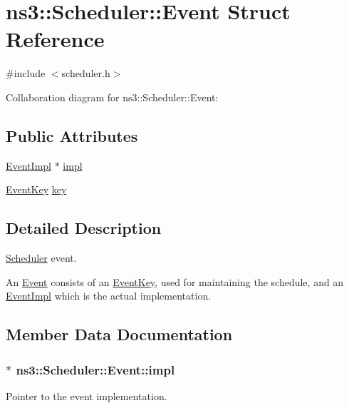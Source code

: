 \hypertarget{structns3_1_1Scheduler_1_1Event}{}\section{ns3\+:\+:Scheduler\+:\+:Event Struct Reference}
\label{structns3_1_1Scheduler_1_1Event}


{\ttfamily \#include $<$scheduler.\+h$>$}



Collaboration diagram for ns3\+:\+:Scheduler\+:\+:Event\+:
\subsection*{Public Attributes}
\begin{DoxyCompactItemize}
\item 
\hyperlink{classns3_1_1EventImpl}{Event\+Impl} $\ast$ \hyperlink{structns3_1_1Scheduler_1_1Event_ae12a8784ab1619e5c759b62102676a9b}{impl}
\item 
\hyperlink{structns3_1_1Scheduler_1_1EventKey}{Event\+Key} \hyperlink{structns3_1_1Scheduler_1_1Event_ac6ca3eb418ec5913e6aa630f5f842a7c}{key}
\end{DoxyCompactItemize}


\subsection{Detailed Description}
\hyperlink{classns3_1_1Scheduler}{Scheduler} event.

An \hyperlink{structns3_1_1Scheduler_1_1Event}{Event} consists of an \hyperlink{structns3_1_1Scheduler_1_1EventKey}{Event\+Key}, used for maintaining the schedule, and an \hyperlink{classns3_1_1EventImpl}{Event\+Impl} which is the actual implementation. 

\subsection{Member Data Documentation}
\subsubsection[{\texorpdfstring{impl}{impl}}]{$\ast$ ns3\+::\+Scheduler\+::\+Event\+::impl}\hypertarget{structns3_1_1Scheduler_1_1Event_ae12a8784ab1619e5c759b62102676a9b}{}\label{structns3_1_1Scheduler_1_1Event_ae12a8784ab1619e5c759b62102676a9b}
Pointer to the event implementation. 
